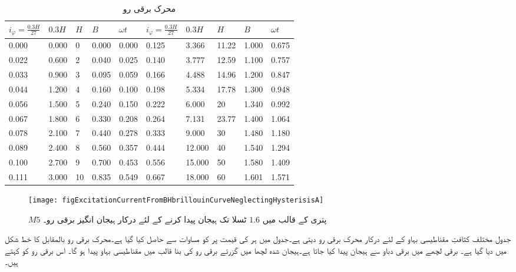 %
\begin{table}
\caption{محرک برقی رو}
\label{جدول_مقناطیسی_ادوار_محرک_برقی_رو_بالمقابل_کثافت_بہاو}
\begin{otherlanguage}{english}
\begin{tabular}{l l l l l | l l l l l}
$i_{\varphi}=\frac{0.3 H}{27}$&$0.3H$&$H$&$B$&$\omega t$&$i_{\varphi}=\frac{0.3 H}{27}$&$0.3H$&$H$&$B$&$\omega t$\\
\midrule
0.000&0.000&0&0.000&0.000&0.125&3.366&11.22&1.000&0.675\\
0.022&0.600&2&0.040&0.025&0.140&3.777&12.59&1.100&0.757\\
0.033&0.900&3&0.095&0.059&0.166&4.488&14.96&1.200&0.847\\
0.044&1.200&4&0.160&0.100&0.198&5.334&17.78&1.300&0.948\\
0.056&1.500&5&0.240&0.150&0.222&6.000&20&1.340&0.992\\
0.067&1.800&6&0.330&0.208&0.264&7.131&23.77&1.400&1.064\\
0.078&2.100&7&0.440&0.278&0.333&9.000&30&1.480&1.180\\
0.089&2.400&8&0.560&0.357&0.444&12.000&40&1.540&1.294\\
0.100&2.700&9&0.700&0.453&0.556&15.000&50&1.580&1.409\\
0.111&3.000&10&0.835&0.549&0.667&18.000&60&1.601&1.571\\
\bottomrule
\end{tabular}
\end{otherlanguage}
\end{table}
%
\begin{figure}
\centering
\texttt{[image: figExcitationCurrentFromBHbrillouinCurveNeglectingHysterisisA]}
\caption{$M5$ پتری کے قالب میں $1.6$ ٹسلا تک ہیجان پیدا کرنے کے لئے درکار ہیجان انگیز برقی رو۔}
\label{شکل_مقناطیسی_ادوار_ہیجان_رو_چال_نظرانداز}
\end{figure}

جدول   مختلف کثافتِ مقناطیسی بہاو کے لئے درکار محرک برقی رو دیتی ہے۔جدول میں  ہر  کی قیمت پر   کو مساوات    سے حاصل کیا گیا ہے۔محرک برقی رو بالمقابل  کا خط شکل  میں دیا گیا ہے۔
%
برقی لچھے میں برقی دباو سے ہیجان پیدا کیا جاتا ہے۔ہیجان شدہ لچھا میں گزرتے برقی رو  کی بنا  قالب میں مقناطیسی بہاو پیدا ہو گا۔ اس برقی رو  کو   کہتے ہیں۔

